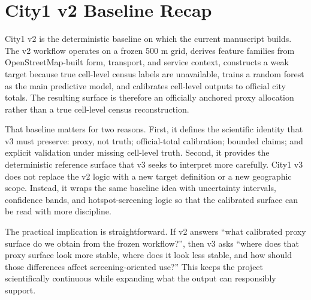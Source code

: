 \section{City1 v2 Baseline Recap}

City1 v2 is the deterministic baseline on which the current manuscript builds. The v2 workflow operates on a frozen 500 m grid, derives feature families from OpenStreetMap-built form, transport, and service context, constructs a weak target because true cell-level census labels are unavailable, trains a random forest as the main predictive model, and calibrates cell-level outputs to official city totals. The resulting surface is therefore an officially anchored proxy allocation rather than a true cell-level census reconstruction.

That baseline matters for two reasons. First, it defines the scientific identity that v3 must preserve: proxy, not truth; official-total calibration; bounded claims; and explicit validation under missing cell-level truth. Second, it provides the deterministic reference surface that v3 seeks to interpret more carefully. City1 v3 does not replace the v2 logic with a new target definition or a new geographic scope. Instead, it wraps the same baseline idea with uncertainty intervals, confidence bands, and hotspot-screening logic so that the calibrated surface can be read with more discipline.

The practical implication is straightforward. If v2 answers ``what calibrated proxy surface do we obtain from the frozen workflow?'', then v3 asks ``where does that proxy surface look more stable, where does it look less stable, and how should those differences affect screening-oriented use?'' This keeps the project scientifically continuous while expanding what the output can responsibly support.

